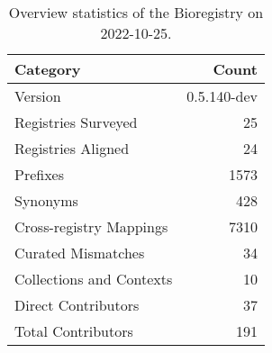 \begin{table}
\centering
\caption{Overview statistics of the Bioregistry on 2022-10-25.}
\label{tab:bioregistry-summary}
\begin{tabular}{lr}
\toprule
                Category &       Count \\
\midrule
                 Version & 0.5.140-dev \\
     Registries Surveyed &          25 \\
      Registries Aligned &          24 \\
                Prefixes &        1573 \\
                Synonyms &         428 \\
 Cross-registry Mappings &        7310 \\
      Curated Mismatches &          34 \\
Collections and Contexts &          10 \\
     Direct Contributors &          37 \\
      Total Contributors &         191 \\
\bottomrule
\end{tabular}
\end{table}
